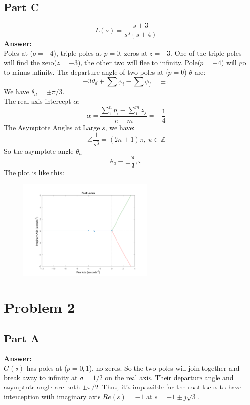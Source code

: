 \documentclass[a4paper]{article}
\begin{document}
\subsection{Part C}
$$
L(s) = \frac{s+3}{s^3(s+4)}
$$
{\bf Answer:}\\
Poles at ($p = -4$), triple poles at $p = 0$, zeros at $z = -3$. One of the triple poles will find the zero($z = -3$), the other two will flee to infinity. Pole($p = -4$) will go to minus infinity. The departure angle of two poles at ($p = 0$) $\theta$ are:
$$
-3\theta_d +  \sum\psi_i-\sum \phi_j = \pm \pi
$$
We have $\theta_d = \pm \pi/3$.\\
The real axis intercept $\alpha$:
$$
\alpha = \frac{\sum_{1}^{n}p_i-\sum_1^m z_j}{n-m} = -\frac14
$$
The Asymptote Angles at Large $s$, we have:
$$
\angle\frac{1}{s^3} = (2n+1)\pi,\ n \in \mathbb{Z}
$$
So the asymptote angle $\theta_a$:
$$
\theta_a = \pm\frac{\pi}{3},\pi
$$
The plot is like this:
\begin{figure}[H]
\centering
\includegraphics[width = 0.6\textwidth]{pic/t3.png}
\end{figure}


\section{Problem 2}
\subsection{Part A}
{\bf Answer:}\\
$G(s)$ has poles at ($p = 0,1$), no zeros. So the two poles will join together and break away to infinity at $\sigma = 1/2$ on the real axis. Their departure angle and asymptote angle are both $\pm \pi/2$. Thus, it's impossible for the root locus to have interception with imaginary axis $Re(s) = -1$ at $s = -1 \pm j\sqrt{3}$. \\
\end{document}
